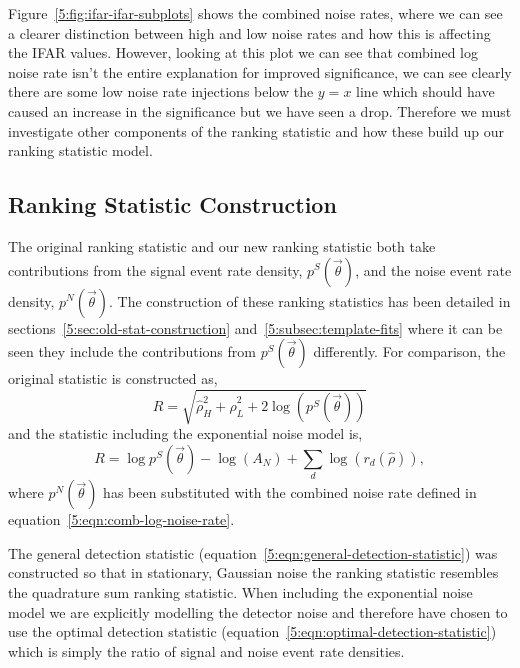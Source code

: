 Figure~\ref{5:fig:ifar-ifar-subplots} shows the combined noise rates, where we can see a clearer distinction between high and low noise rates and how this is affecting the IFAR values. However, looking at this plot we can see that combined log noise rate isn't the entire explanation for improved significance, we can see clearly there are some low noise rate injections below the $y=x$ line which should have caused an increase in the significance but we have seen a drop. Therefore we must investigate other components of the ranking statistic and how these build up our ranking statistic model.

\subsection{\label{5:sec:comparing-statistic-construction}Ranking Statistic Construction}

The original ranking statistic and our new ranking statistic both take contributions from the signal event rate density, $p^{S}(\Vec{\theta})$, and the noise event rate density, $p^{N}(\Vec{\theta})$. The construction of these ranking statistics has been detailed in sections~\ref{5:sec:old-stat-construction} and~\ref{5:subsec:template-fits} where it can be seen they include the contributions from $p^{S}(\Vec{\theta})$ differently. For comparison, the original statistic is constructed as,
%
\begin{equation}
    R = \sqrt{\hat{\rho}^{2}_{H} + \hat{\rho}^{2}_{L} + 2\log\left(p^{S}(\Vec{\theta})\right)}
    \label{5:eqn:original-statistic-repeat}
\end{equation}
%
and the statistic including the exponential noise model is,
%
\begin{equation}
    R = \log p^{S}(\Vec{\theta}) - \log\left(A_{N}\right) + \sum_{d} \log\left(r_{d}(\hat{\rho})\right),
    \label{5:eqn:new-statistic}
\end{equation}
%
where $p^{N}(\Vec{\theta})$ has been substituted with the combined noise rate defined in equation~\ref{5:eqn:comb-log-noise-rate}.

The general detection statistic (equation~\ref{5:eqn:general-detection-statistic}) was constructed so that in stationary, Gaussian noise the ranking statistic resembles the quadrature sum ranking statistic. When including the exponential noise model we are explicitly modelling the detector noise and therefore have chosen to use the optimal detection statistic (equation~\ref{5:eqn:optimal-detection-statistic}) which is simply the ratio of signal and noise event rate densities.


